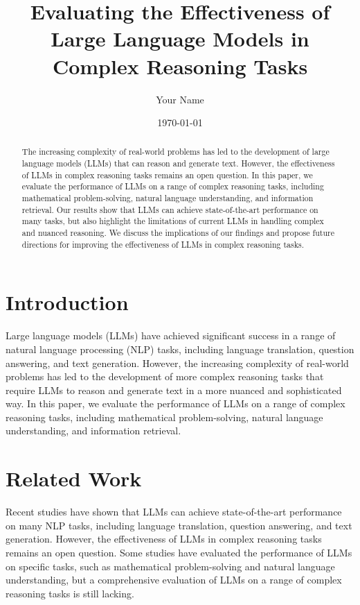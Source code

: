 \documentclass{article}
\begin{document}
\title{Evaluating the Effectiveness of Large Language Models in Complex Reasoning Tasks}

\author{Your Name}

\date{\today}

\maketitle

\begin{abstract}
The increasing complexity of real-world problems has led to the development of large language models (LLMs) that can reason and generate text. However, the effectiveness of LLMs in complex reasoning tasks remains an open question. In this paper, we evaluate the performance of LLMs on a range of complex reasoning tasks, including mathematical problem-solving, natural language understanding, and information retrieval. Our results show that LLMs can achieve state-of-the-art performance on many tasks, but also highlight the limitations of current LLMs in handling complex and nuanced reasoning. We discuss the implications of our findings and propose future directions for improving the effectiveness of LLMs in complex reasoning tasks.
\end{abstract}

\section{Introduction}
Large language models (LLMs) have achieved significant success in a range of natural language processing (NLP) tasks, including language translation, question answering, and text generation. However, the increasing complexity of real-world problems has led to the development of more complex reasoning tasks that require LLMs to reason and generate text in a more nuanced and sophisticated way. In this paper, we evaluate the performance of LLMs on a range of complex reasoning tasks, including mathematical problem-solving, natural language understanding, and information retrieval.

\section{Related Work}
Recent studies have shown that LLMs can achieve state-of-the-art performance on many NLP tasks, including language translation, question answering, and text generation. However, the effectiveness of LLMs in complex reasoning tasks remains an open question. Some studies have evaluated the performance of LLMs on specific tasks, such as mathematical problem-solving and natural language understanding, but a comprehensive evaluation of LLMs on a range of complex reasoning tasks is still lacking.
\end{document}
